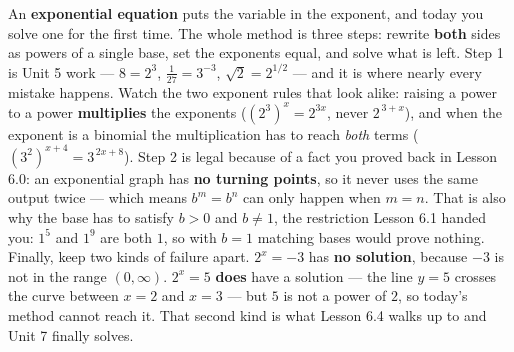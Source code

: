\documentclass[10pt]{article}
\begin{document}
\vspace{0.10in}

\begin{remindbox}
\small An \textbf{exponential equation} puts the variable in the exponent, and today you solve one for
the first time. The whole method is three steps: rewrite \textbf{both} sides as powers of a single
base, set the exponents equal, and solve what is left. Step 1 is Unit 5 work --- $8=2^{3}$,
$\frac{1}{27}=3^{-3}$, $\sqrt{2}=2^{1/2}$ --- and it is where nearly every mistake happens. Watch the
two exponent rules that look alike: raising a power to a power \textbf{multiplies} the exponents
($\left(2^{3}\right)^{x}=2^{3x}$, never $2^{\,3+x}$), and when the exponent is a binomial the
multiplication has to reach \emph{both} terms ($\left(3^{2}\right)^{x+4}=3^{\,2x+8}$). Step 2 is legal
because of a fact you proved back in Lesson 6.0: an exponential graph has \textbf{no turning points},
so it never uses the same output twice --- which means $b^{m}=b^{n}$ can only happen when $m=n$. That
is also why the base has to satisfy $b>0$ and $b\neq1$, the restriction Lesson 6.1 handed you: $1^{5}$
and $1^{9}$ are both $1$, so with $b=1$ matching bases would prove nothing. Finally, keep two kinds of
failure apart. $2^{x}=-3$ has \textbf{no solution}, because $-3$ is not in the range $(0,\infty)$.
$2^{x}=5$ \textbf{does} have a solution --- the line $y=5$ crosses the curve between $x=2$ and $x=3$
--- but $5$ is not a power of $2$, so today's method cannot reach it. That second kind is what Lesson
6.4 walks up to and Unit 7 finally solves.
\end{remindbox}
\end{document}

